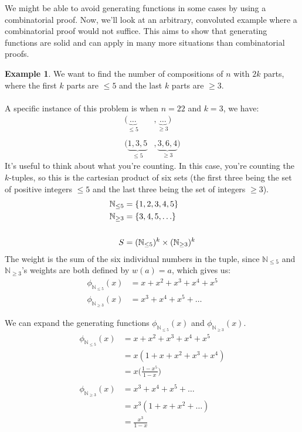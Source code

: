 \documentclass[]{article}
\theoremstyle{definition}
\newtheorem{ex}{Example}[section]
\newcommand{\lecture}[1]{\marginpar{{\footnotesize $\leftarrow$ \underline{#1}}}}
\DeclarePairedDelimiter{\set}{\lbrace}{\rbrace}
\begin{document}
				We might be able to avoid generating functions in some cases by using a combinatorial proof. Now, we'll look at an arbitrary, convoluted example where a combinatorial proof would not suffice. This aims to show that generating functions are solid and can apply in many more situations than combinatorial proofs.

				\begin{ex}
					We want to find the number of compositions of $n$ with $2k$ parts, where the first $k$ parts are $\le 5$ and the last $k$ parts are $\ge 3$.
					\\ \\
					A specific instance of this problem is when $n = 22$ and $k = 3$, we have:
					\begin{align*}
						(\underbrace{\dots}_{\le 5}&, \underbrace{\dots}_{\ge 3}) \\ \\
						(\underbrace{1, 3, 5}_{\le 5}&, \underbrace{3, 6, 4}_{\ge 3})
					\end{align*}
					It's useful to think about what you're counting. In this case, you're counting the $k$-tuples, so this is the cartesian product of six sets (the first three being the set of positive integers $\le 5$ and the last three being the set of integers $\ge 3$).
					\begin{align*}
						\mathbb{N}_{\le 5} &= \set{1, 2, 3, 4, 5} \\
						\mathbb{N}_{\ge 3} &= \set{3, 4, 5, \ldots}
						\\ \\
						S &= (\mathbb{N}_{\le 5})^k \times (\mathbb{N}_{\ge 3})^k
					\end{align*}
					The weight is the sum of the six individual numbers in the tuple, since $\mathbb{N}_{\le 5}$ and $\mathbb{N}_{\ge 3}$'s weights are both defined by $w(a) = a$, which gives us:
					\begin{align*}
						\phi_{\mathbb{N}_{\le 5}}(x) &= x + x^2 + x^3 + x^4 + x^5 \\
						\phi_{\mathbb{N}_{\ge 3}}(x) &= x^3 + x^4 + x^5 + \ldots
					\end{align*}

					\lecture{January 23, 2013}
					We can expand the generating functions $\phi_{\mathbb{N}_{\le 5}}(x)$ and $\phi_{\mathbb{N}_{\ge 3}}(x)$.
					\begin{align*}
						\phi_{\mathbb{N}_{\le 5}}(x) &= x + x^2 + x^3 + x^4 + x^5 \\
						&= x(1 + x + x^2 + x^3 + x^4) \\
						&= x \bigg( \frac{1 - x^5}{1 - x} \bigg)
						\\ \\
						\phi_{\mathbb{N}_{\ge 3}}(x) &= x^3 + x^4 + x^5 + \ldots \\
						&= x^3(1 + x + x^2 + \ldots) \\
						&= \frac{x^3}{1 - x}
					\end{align*}


\end{ex}
\end{document}
